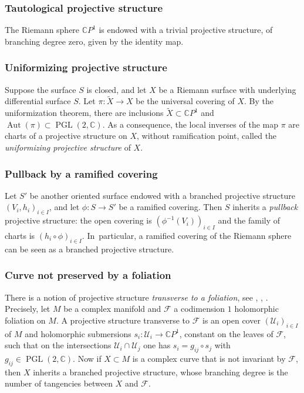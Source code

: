 \documentclass[JEP,XML,SOM,Unicode,NoEqCountersInSection,published]{cedram}
\newcommand{\C}{\mathbb C}
\newcommand{\CP}{\mathbb CP}
\DeclareMathOperator{\Aut}{Aut}
\DeclareMathOperator{\PGL}{PGL}
\theoremstyle{definition}
\theoremstyle{plain}
\begin{document}
\subsubsection*{Tautological projective structure}
The Riemann sphere $\CP^1$ is endowed with a trivial projective structure, of branching degree zero, given by the identity map.

\subsubsection*{Uniformizing projective structure}
Suppose the surface $S$ is closed, and let $X$ be a Riemann surface with underlying differential surface $S$.
Let $\pi: \widetilde X \to X$ be the universal covering of $X$.
By the uniformization theorem, there are inclusions $\widetilde X \subset \CP^1$ and $\Aut(\pi) \subset \PGL(2, \C)$.
As a consequence, the local inverses of the map $\pi$ are charts of a projective structure on $X$, without ramification point, called the \emph{uniformizing projective structure} of $X$.

\subsubsection*{Pullback by a ramified covering}
Let $S'$ be another oriented surface endowed with a branched projective structure $(V_i, h_i)_{i \in I}$, and let $\phi: S \to S'$ be a ramified covering.
Then $S$ inherits a \emph{pullback} projective structure: the open covering is $\left(\phi^{-1}(V_i)\right)_{i \in I}$ and the family of charts is $(h_i \circ \phi)_{i \in I}$. In~particular, a ramified covering of the Riemann sphere can be seen as a branched projective structure.

\subsubsection*{Curve not preserved by a foliation}
There is a notion of projective structure \emph{transverse to a foliation}, see \cite{blumenthal}, \cite{godbillon}, \cite{scardua}.
Precisely, let $M$ be a complex manifold and $\mathcal F$ a codimension $1$ holomorphic foliation on $M$.
A projective structure transverse to $\mathcal F$ is an open cover $(\mathcal U_i)_{i \in I}$ of $M$ and holomorphic submersions $s_i: \mathcal U_i \to \CP^1$, constant on the leaves of $\mathcal F$, such that on the intersections $\mathcal U_i \cap \mathcal U_j$ one has $s_i = g_{ij} \circ s_j$ with $g_{ij} \in \PGL(2, \C)$.
Now if $X \subset M$ is a complex curve that is not invariant by $\mathcal F$, then $X$ inherits a branched projective structure, whose branching degree is the number of tangencies between $X$ and $\mathcal F$.
\end{document}
